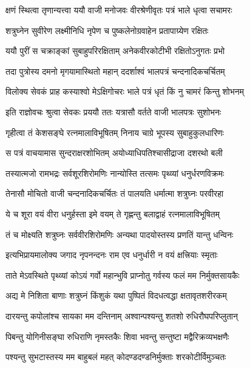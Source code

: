 

\twolineshloka
{क्षणं स्थित्वा तृणान्यत्त्वा ययौ वाजी मनोजवः}
{वीरश्रेणीवृतः पत्रं भाले धृत्वा सचामरः}%

\twolineshloka
{शत्रुघ्नेन सुवीरेण लक्ष्मीनिधि नृपेण च}
{पुष्कलेनोग्रवाहेन प्रतापाग्र्येण रक्षितः}%

\twolineshloka
{ययौ पुरीं स चक्राङ्कां सुबाहुपरिरक्षिताम्}
{अनेकवीरकोटीभी रक्षितोऽनुगतः प्रभो}%

\twolineshloka
{तदा पुत्रोस्य दमनो मृगयामास्थितो महान्}
{ददर्शाश्वं भालपत्रं चन्दनादिकचर्चितम्}%

\twolineshloka
{विलोक्य सेवकं प्राह कस्याश्वो मेऽक्षिगोचरः}
{भाले पत्रं धृतं किं नु चामरं किन्तु शोभनम्}%

\twolineshloka
{इति राज्ञोवचः श्रुत्वा सेवकः प्रययौ ततः}
{यत्रासौ वर्तते वाजी भालपत्रः सुशोभनः}%

\twolineshloka
{गृहीत्वा तं केशसङ्घे रत्नमालाविभूषितम्}
{निनाय चाग्रे भूपस्य सुबाहुकुलधारिणः}%

\twolineshloka
{स पत्रं वाचयामास सुन्दराक्षरशोभितम्}
{अयोध्याधिपतिश्चासीद्राजा दशरथो बली}%

\twolineshloka
{तस्यात्मजो रामभद्रः सर्वशूरशिरोमणिः}
{नान्योस्ति तत्समः पृथ्व्यां धनुर्धरणविक्रमः}%

\twolineshloka
{तेनासौ मोचितो वाजी चन्दनादिकचर्चितः}
{तं पालयति धर्मात्मा शत्रुघ्नः परवीरहा}%

\twolineshloka
{ये च शूरा वयं वीरा धनुर्हस्ता इमे वयम्}
{ते गृह्णन्तु बलाद्वाहं रत्नमालाविभूषितम्}%

\twolineshloka
{तं च मोक्ष्यति शत्रुघ्नः सर्ववीरशिरोमणिः}
{अन्यथा पादयोस्तस्य प्रणतिं यान्तु धन्विनः}%

\twolineshloka
{इत्यभिप्रायमालोक्य जगाद नृपनन्दनः}
{राम एव धनुर्धारी न वयं क्षत्त्रियाः स्मृताः}%

\twolineshloka
{ताते मेऽवस्थिते पृथ्व्यां कोऽयं गर्वो महान्भुवि}
{प्राप्नोतु गर्वस्य फलं मम निर्मुक्तसायकैः}%

\twolineshloka
{अद्य मे निशिता बाणाः शत्रुघ्नं किंशुकं यथा}
{पुष्पितं विदधत्वद्धा क्षतावृतशरीरकम्}%

\twolineshloka
{दारयन्तु कपोलांश्च सायका मम दन्तिनाम्}
{अश्वान्पश्यन्तु शतशो रुधिरौघपरिप्लुतान्}%

\twolineshloka
{पिबन्तु योगिनीसङ्घा रुधिराणि नृमस्तकैः}
{शिवा भवन्तु सन्तुष्टा मद्वैरिक्रव्यभक्षणैः}%

\twolineshloka
{पश्यन्तु सुभटास्तस्य मम बाहुबलं महत्}
{कोदण्डदण्डनिर्मुक्ताः शरकोटीर्विमुञ्चतः}%

